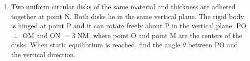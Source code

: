 \documentclass[12pt,letterpaper]{article}
\begin{document}
\begin{enumerate}[resume]


\item
Two uniform circular disks of the same material and thickness are adhered together at point N. Both disks lie in the same vertical plane. The rigid body is hinged at point P and it can rotate freely about P in the vertical plane.  PO $\perp$ OM and ON $= 3$ NM, where point O and point M are the centers of the disks. When static equilibrium is reached, find the angle $\theta$ between PO and the vertical direction.

\begin{tabular}{l r}


\end{tabular}
\end{enumerate}
\end{document}
